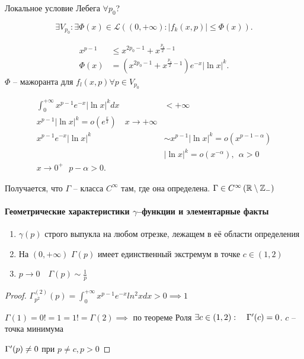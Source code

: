 \begin{note}
    Локальное условие Лебега $\forall p_0$?

    \[
    \exists V_{p_0}: \exists \Phi(x) \in \mathcal L \left( \left( 0, +\infty  \right): \left| f_k(x, p) \right| \leqslant \Phi(x)  \right) 
    .\] 

    \begin{align*}
        x^{p-1} & \leqslant x^{2p_0-1} + x^{\frac{p_0}{2}-1} \\
        \Phi(x) &= \left( x^{2p_0-1} + x^{\frac{p_0}{2}-1} \right)e^{-x}\left| \ln x \right| ^k.
    \end{align*}
    $\Phi$ -- мажоранта для $f_l(x, p) \forall p\in V_{p_0}$

    \begin{align*}
        \int_0^{+\infty }x^{p-1}e^{-x} \left| \ln x \right| ^kdx &< +\infty \\
        x^{p-1}|\ln x|^k = o(e^{\frac{x}{2}})\quad  x \to+\infty \\
        x^{p-1}e^{-x}\left| \ln x \right| ^k &\sim x^{p-1}\left| \ln x \right| ^k = o(x^{p-1-\alpha})\\
        &|\ln x |^k = o(x^{-\alpha}),~~ \alpha > 0\\
        x \to 0^{+}~~~ p -\alpha > 0.
        \end{align*}

    Получается, что $\Gamma$ -- класса $C^{\infty }$ там, где она определена. $\Gamma \in C^{\infty }\left( \mathbb{R}\setminus \mathbb{Z} _-  \right) $
\end{note}

\paragraph{Геометрические характеристики $\gamma$--функции и элементарные факты}

\begin{property} 
\begin{enumerate}
    \item $\gamma(p)$ строго выпукла на любом отрезке, лежащем в её области определения
    \item На $(0, +\infty )$ $\Gamma(p)$ имеет единственный экстремум в точке $c\in (1, 2)$
    \item $p\to 0\quad \Gamma(p) \sim \frac{1}{p}$
\end{enumerate}
\end{property}
\begin{proof}
    $\Gamma^{(2)}_{p^2}(p) = \int_0^{+\infty }x^{p-1}e^{-x}ln^2x dx >0 \implies 1$
    
    $\Gamma(1) = 0! =1 = 1! = \Gamma(2) \implies $ по теореме Роля $\exists c\in (1, 2):\quad \Gamma^{\prime}(c) = 0$. $c$ -- точка минимума

    $\Gamma^{\prime}(p)\neq 0$ при $p\neq c, p>0$
\end{proof}

